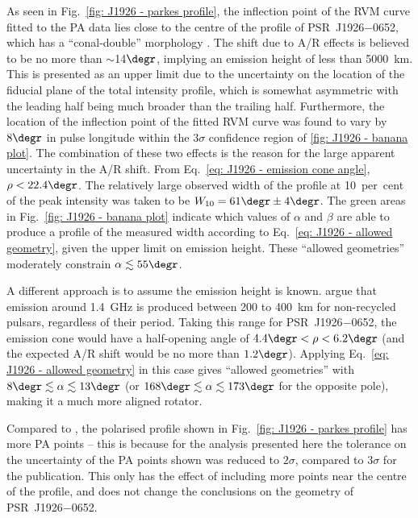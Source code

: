 As seen in Fig.~\ref{fig: J1926 - parkes profile}, the inflection point of the RVM curve fitted to the PA data lies close to the centre of the profile of PSR~J1926$-$0652, which has a ``conal-double'' morphology \citep[][]{Rxxx1983a}. The shift due to A/R effects is believed to be no more than $\sim$14$\degr$, implying an emission height of less than 5000~km. This is presented as an upper limit due to the uncertainty on the location of the fiducial plane of the total intensity profile, which is somewhat asymmetric with the leading half being much broader than the trailing half. Furthermore, the location of the inflection point of the fitted RVM curve was found to vary by $8\degr$ in pulse longitude within the $3\sigma$ confidence region of \ref{fig: J1926 - banana plot}. The combination of these two effects is the reason for the large apparent uncertainty in the A/R shift. From Eq.~\eqref{eq: J1926 - emission cone angle}, $\rho < 22.4\degr$. The relatively large observed width of the profile at 10~per~cent of the peak intensity was taken to be $W_{10} = 61\degr\pm 4\degr$. The green areas in Fig.~\ref{fig: J1926 - banana plot} indicate which values of $\alpha$ and $\beta$ are able to produce a profile of the measured width according to Eq.~\eqref{eq: J1926 - allowed geometry}, given the upper limit on emission height. These ``allowed geometries'' moderately constrain $\alpha \lesssim 55\degr$.

A different approach is to assume the emission height is known. \citet{JKxx2019} argue that emission around 1.4~GHz is produced between 200 to 400~km for non-recycled pulsars, regardless of their period. Taking this range for PSR~J1926$-$0652, the emission cone would have a half-opening angle of $4.4\degr < \rho < 6.2\degr$ (and the expected A/R shift would be no more than $1.2\degr$). Applying Eq.~\eqref{eq: J1926 - allowed geometry} in this case gives ``allowed geometries'' with $8\degr \lesssim \alpha \lesssim 13\degr$ (or $168\degr \lesssim \alpha \lesssim 173\degr$ for the opposite pole), making it a much more aligned rotator. 


Compared to \citet{ZLH+2019}, the polarised profile shown in Fig.~\ref{fig: J1926 - parkes profile} has more PA points -- this is because for the analysis presented here the tolerance on the uncertainty of the PA points shown was reduced to $2\sigma$, compared to $3\sigma$ for the publication. This only has the effect of including more points near the centre of the profile, and does not change the conclusions on the geometry of PSR~J1926$-$0652.





